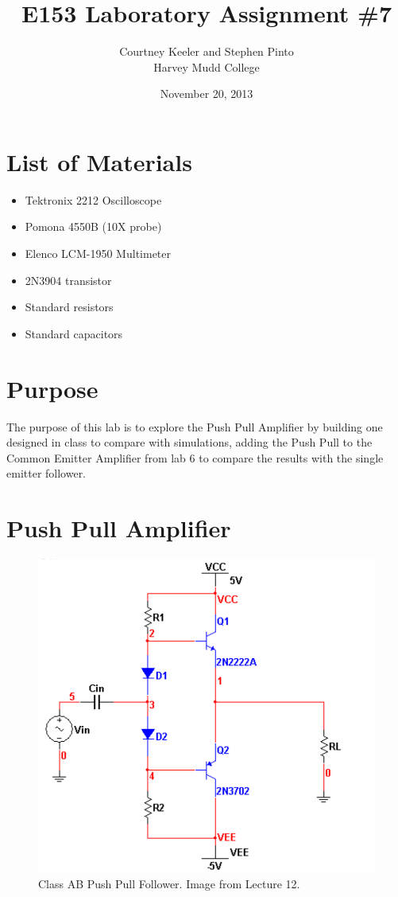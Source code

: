 \documentclass[12pt,letterpaper]{report}
\newlength \figwidth
\begin{document}
\title{E153 Laboratory Assignment \#7}
\author{Courtney Keeler and Stephen Pinto\\
Harvey Mudd College}
\date{November 20, 2013}
\maketitle

\section*{List of Materials}
\begin{itemize}
	\item Tektronix 2212 Oscilloscope
	\item Pomona 4550B (10X probe)
	\item Elenco LCM-1950 Multimeter
	\item 2N3904 transistor
	\item Standard resistors
	\item Standard capacitors
\end{itemize}

\section*{Purpose}
The purpose of this lab is to explore the Push Pull Amplifier by building one designed in class to compare with simulations, adding the Push Pull to the Common Emitter Amplifier from lab 6 to compare the results with the single emitter follower.

\section*{Push Pull Amplifier}

\begin{figure}[H]
\centering
\includegraphics[width=\figwidth, keepaspectratio=true]{lab7_images/push_pull.png}
\caption{Class AB Push Pull Follower. Image from Lecture 12.}
\label{fig:push_pull}
\end{figure}
\end{document}
